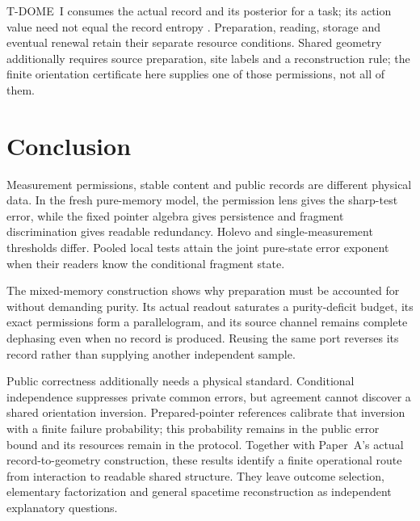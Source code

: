 \documentclass[12pt,a4paper]{article}
\begin{document}
T-DOME~I consumes the actual record and its posterior for a task;
its action value need not equal the record entropy
\cite{Liu2026TDOME_I}. Preparation, reading, storage and eventual renewal
retain their separate resource conditions. Shared geometry additionally
requires source preparation, site labels and a reconstruction rule;
the finite orientation certificate here supplies one of those
permissions, not all of them.

\section{Conclusion}
\label{sec:conclusion}

Measurement permissions, stable content and public records are
different physical data. In the fresh pure-memory model, the
permission lens gives the sharp-test error, while the fixed
pointer algebra gives persistence and fragment discrimination
gives readable redundancy. Holevo and single-measurement
thresholds differ. Pooled local tests attain the joint
pure-state error exponent when their readers know the
conditional fragment state.

The mixed-memory construction shows why preparation must be
accounted for without demanding purity. Its actual readout
saturates a purity-deficit budget, its exact permissions form
a parallelogram, and its source channel remains complete
dephasing even when no record is produced. Reusing the same
port reverses its record rather than supplying another
independent sample.

Public correctness additionally needs a physical standard.
Conditional independence suppresses private common errors,
but agreement cannot discover a shared orientation inversion.
Prepared-pointer references calibrate that inversion with a
finite failure probability; this probability remains in the
public error bound and its resources remain in the protocol.
Together with Paper~A's actual record-to-geometry construction,
these results identify a finite operational route from
interaction to readable shared structure. They leave outcome
selection, elementary factorization and general spacetime
reconstruction as independent explanatory questions.
\end{document}
